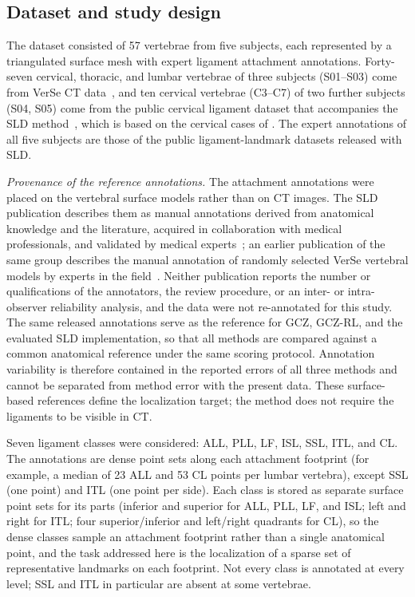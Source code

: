 \documentclass[5p,times,twocolumn,authoryear]{elsarticle}
\newif\ifhighlight
\newcommand{\rev}[1]{\ifhighlight{\color{revcolor}#1}\else#1\fi}
\newcommand{\revstart}{\ifhighlight\begingroup\color{revcolor}\fi}
\newcommand{\revend}{\ifhighlight\par\endgroup\fi}
\begin{document}
\subsection{Dataset and study design}
\label{ssec:dataset}

The dataset consisted of 57 vertebrae from five subjects, each represented by a triangulated surface mesh with expert ligament attachment annotations. Forty-seven cervical, thoracic, and lumbar vertebrae of three subjects (S01--S03) come from VerSe CT data~\citep{sekuboyina2021}, and ten cervical vertebrae (C3--C7) of two further subjects (S04, S05) come from the public cervical ligament dataset that accompanies the SLD method~\citep{blomenkamp2026sld}, which is based on the cervical cases of \citet{aldhamari2019}. The expert annotations of all five subjects are those of the public ligament-landmark datasets released with SLD.

\revstart
\emph{Provenance of the reference annotations.} The attachment annotations were placed on the vertebral surface models rather than on CT images. The SLD publication describes them as manual annotations derived from anatomical knowledge and the literature, acquired in collaboration with medical professionals, and validated by medical experts~\citep{blomenkamp2026sld}; an earlier publication of the same group describes the manual annotation of randomly selected VerSe vertebral models by experts in the field~\citep{kramer2024}. Neither publication reports the number or qualifications of the annotators, the review procedure, or an inter- or intra-observer reliability analysis, and the data were not re-annotated for this study. The same released annotations serve as the reference for GCZ, GCZ-RL, and the evaluated SLD implementation, so that all methods are compared against a common anatomical reference under the same scoring protocol. Annotation variability is therefore contained in the reported errors of all three methods and cannot be separated from method error with the present data. These surface-based references define the localization target; the method does not require the ligaments to be visible in CT.
\revend

Seven ligament classes were considered: ALL, PLL, LF, ISL, SSL, ITL, and CL. The annotations are dense point sets along each attachment footprint (for example, a median of 23 ALL and 53 CL points per lumbar vertebra), except SSL (one point) and ITL (one point per side). \rev{Each class is stored as separate surface point sets for its parts (inferior and superior for ALL, PLL, LF, and ISL; left and right for ITL; four superior/inferior and left/right quadrants for CL), so the dense classes sample an attachment footprint rather than a single anatomical point, and the task addressed here is the localization of a sparse set of representative landmarks on each footprint.} Not every class is annotated at every level; SSL and ITL in particular are absent at some vertebrae.
\end{document}
